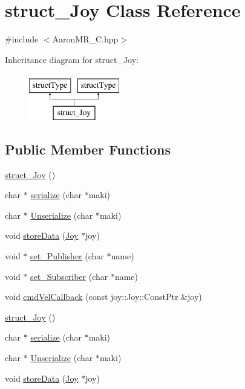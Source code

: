 \hypertarget{classstruct__Joy}{
\section{struct\_\-Joy Class Reference}
\label{classstruct__Joy}
}


{\ttfamily \#include $<$AaronMR\_\-C.hpp$>$}

Inheritance diagram for struct\_\-Joy:\begin{figure}[H]
\begin{center}
\leavevmode
\includegraphics[height=2cm]{classstruct__Joy}
\end{center}
\end{figure}
\subsection*{Public Member Functions}
\begin{DoxyCompactItemize}
\item 
\hyperlink{classstruct__Joy_acd6825fe6adb60efa565e5ee22450255}{struct\_\-Joy} ()
\item 
char $\ast$ \hyperlink{classstruct__Joy_a85a218f4a0da41e33f9bf001c12c3a5a}{serialize} (char $\ast$maki)
\item 
char $\ast$ \hyperlink{classstruct__Joy_af683ec9dbedf3372b8ed17bff8c8b846}{Unserialize} (char $\ast$maki)
\item 
void \hyperlink{classstruct__Joy_a4d15e99a2fd78d6f162d0831ab4549f1}{storeData} (\hyperlink{structJoy}{Joy} $\ast$joy)
\item 
void $\ast$ \hyperlink{classstruct__Joy_a775c0f43b9125d8523ed26e72b6ebc44}{set\_\-Publisher} (char $\ast$name)
\item 
void $\ast$ \hyperlink{classstruct__Joy_a322d144fc1e42403ceb40f1e7f2b8536}{set\_\-Subscriber} (char $\ast$name)
\item 
void \hyperlink{classstruct__Joy_a0663befcb572431d8dc37cccc56bd6e5}{cmdVelCallback} (const joy::Joy::ConstPtr \&joy)
\item 
\hyperlink{classstruct__Joy_acd6825fe6adb60efa565e5ee22450255}{struct\_\-Joy} ()
\item 
char $\ast$ \hyperlink{classstruct__Joy_a0241cea32ad81ade99f9b484107e218d}{serialize} (char $\ast$maki)
\item 
char $\ast$ \hyperlink{classstruct__Joy_a6ad749ee0383dde28696e7aeeb050d09}{Unserialize} (char $\ast$maki)
\item 
void \hyperlink{classstruct__Joy_a4d15e99a2fd78d6f162d0831ab4549f1}{storeData} (\hyperlink{structJoy}{Joy} $\ast$joy)
\end{DoxyCompactItemize}
